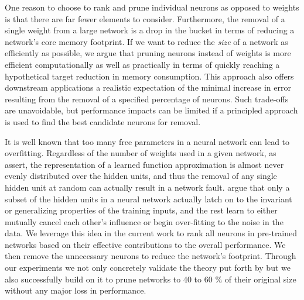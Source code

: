 One reason to choose to rank and prune individual neurons as opposed to weights is that there are far fewer elements to consider. Furthermore, the removal of a single weight from a large network is a drop in the bucket in terms of reducing a network's core memory footprint. If we want to reduce the \textit{size} of a network as efficiently as possible, we argue that pruning neurons instead of weights is more efficient computationally as well as practically in terms of quickly reaching a hypothetical target reduction in memory consumption. This approach also offers downstream applications a realistic expectation of the minimal increase in error resulting from the removal of a specified percentage of neurons. Such trade-offs are unavoidable, but performance impacts can be limited if a principled approach is used to find the best candidate neurons for removal. 

It is well known that too many free parameters in a neural network can lead to overfitting. Regardless of the number of weights used in a given network, as \cite{segee1991fault} assert, the representation of a learned function approximation is almost never evenly distributed over the hidden units, and thus the removal of any single hidden unit at random can actually result in a network fault. \cite{mozer1989using} argue that only a subset of the hidden units in a neural network actually latch on to the invariant or generalizing properties of the training inputs, and the rest learn to either mutually cancel each other's influence or begin over-fitting to the noise in the data. We leverage this idea in the current work to rank all neurons in pre-trained networks based on their effective contributions to the overall performance. We then remove the unnecessary neurons to reduce the network's footprint. Through our experiments we not only concretely validate the theory put forth by \cite{mozer1989using} but we also successfully build on  it to prune networks to 40 to 60 \% of their original size without any major loss in performance.

